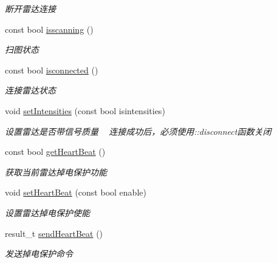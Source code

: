 \begin{DoxyCompactItemize}
\begin{DoxyCompactList}\small\item\em 断开雷达连接 \end{DoxyCompactList}\item 
const bool \hyperlink{classydlidar_1_1_y_dlidar_driver_ab6e35a7ba1eea55dc7ff1d03e0de9a46}{isscanning} ()
\begin{DoxyCompactList}\small\item\em 扫图状态 ~\newline
\end{DoxyCompactList}\item 
const bool \hyperlink{classydlidar_1_1_y_dlidar_driver_ad4eee87f94cdbeabb3866b7dca08249f}{isconnected} ()
\begin{DoxyCompactList}\small\item\em 连接雷达状态 ~\newline
\end{DoxyCompactList}\item 
void \hyperlink{classydlidar_1_1_y_dlidar_driver_a406ae191df8a2a2fa90de4175cfe9d4c}{set\+Intensities} (const bool isintensities)
\begin{DoxyCompactList}\small\item\em 设置雷达是否带信号质量 ~\newline
连接成功后，必须使用\+::disconnect函数关闭 \end{DoxyCompactList}\item 
const bool \hyperlink{classydlidar_1_1_y_dlidar_driver_acbfb9ad990b09902afee8d868a473f68}{get\+Heart\+Beat} ()
\begin{DoxyCompactList}\small\item\em 获取当前雷达掉电保护功能 ~\newline
\end{DoxyCompactList}\item 
void \hyperlink{classydlidar_1_1_y_dlidar_driver_ab2bf62735be18019864c12f0e462c4a2}{set\+Heart\+Beat} (const bool enable)
\begin{DoxyCompactList}\small\item\em 设置雷达掉电保护使能 ~\newline
\end{DoxyCompactList}\item 
result\+\_\+t \hyperlink{classydlidar_1_1_y_dlidar_driver_a6e7dc7cd2a73d24a763cebde840a5d30}{send\+Heart\+Beat} ()
\begin{DoxyCompactList}\small\item\em 发送掉电保护命令 ~\newline

\end{DoxyCompactList}
\end{DoxyCompactItemize}
